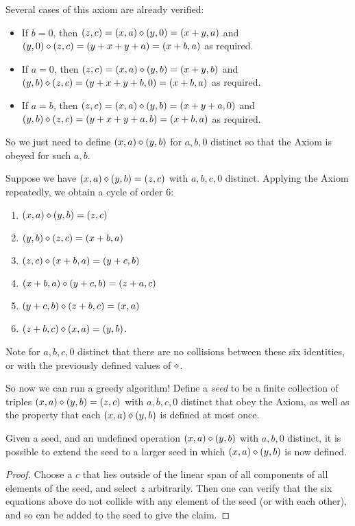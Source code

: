 Several cases of this axiom are already verified:
\begin{itemize}
\item If $b=0$, then $(z,c) = (x,a) \diamond (y,0) = (x+y,a)$ and $(y,0) \diamond (z,c) = (y+x+y+a) = (x+b,a)$ as required.
\item If $a=0$, then $(z,c) = (x,a) \diamond (y,b) = (x+y,b)$ and $(y,b) \diamond (z,c) = (y+x+y+b,0) = (x+b,a)$ as required.
\item If $a=b$, then $(z,c) = (x,a) \diamond (y,b) = (x+y+a,0)$ and $(y,b) \diamond (z,c) = (y+x+y+a,b) = (x+b,a)$ as required.
\end{itemize}

So we just need to define $(x,a) \diamond (y,b)$ for $a,b,0$ distinct so that the Axiom is obeyed for such $a,b$.

Suppose we have $(x,a) \diamond (y,b) = (z,c)$ with $a,b,c,0$ distinct.  Applying the Axiom repeatedly, we obtain a cycle of order $6$:
\begin{enumerate}
  \item $(x,a) \diamond (y,b) = (z,c)$
  \item $ (y,b) \diamond (z,c) = (x+b,a)$
  \item $ (z,c) \diamond (x+b,a) = (y+c,b)$
  \item $ (x+b,a) \diamond (y+c,b) = (z+a,c)$
  \item $ (y+c,b) \diamond (z+b,c) = (x,a)$
  \item $ (z+b,c) \diamond (x,a) = (y,b)$.
\end{enumerate}

Note for $a,b,c,0$ distinct that there are no collisions between these six identities, or with the previously defined values of $\diamond$.

So now we can run a greedy algorithm!  Define a \emph{seed} to be a finite collection of triples $(x,a) \diamond (y,b) = (z,c)$ with $a,b,c,0$ distinct that obey the Axiom, as well as the property that each $(x,a) \diamond (y,b)$ is defined at most once.

\begin{proposition}\label{enlarge-1323-seed}  Given a seed, and an undefined operation $(x,a) \diamond (y,b)$ with $a,b,0$ distinct, it is possible to extend the seed to a larger seed in which $(x,a) \diamond (y,b)$ is now defined.
\end{proposition}

\begin{proof}  Choose a $c$ that lies outside of the linear span of all components of all elements of the seed, and select $z$ arbitrarily.  Then one can verify that the six equations above do not collide with any element of the seed (or with each other), and so can be added to the seed to give the claim.
\end{proof}


